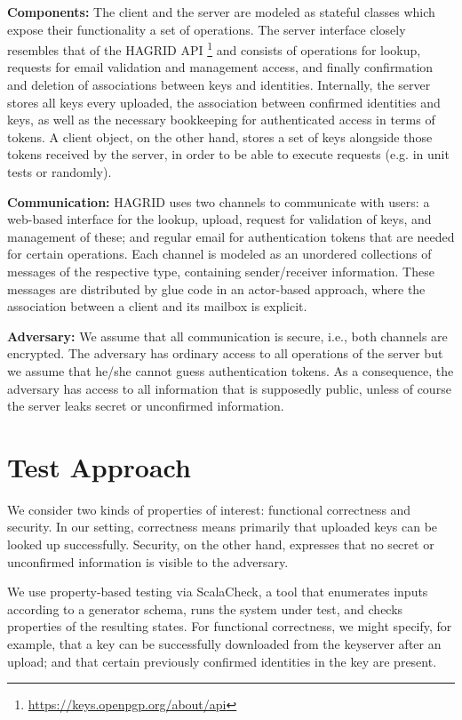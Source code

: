 \documentclass{llncs}
\begin{document}
\textbf{Components:} The client and the server are modeled as stateful classes which expose their functionality a set of operations.
The server interface closely resembles that of the HAGRID API%
    \footnote{\url{https://keys.openpgp.org/about/api}}
and consists of operations for lookup, requests for email validation and management access,
and finally confirmation and deletion of associations between keys and identities.
Internally, the server stores all keys every uploaded, the association between confirmed identities and keys,
as well as the necessary bookkeeping for authenticated access in terms of tokens.
A client object, on the other hand, stores a set of keys alongside those tokens received by the server, in order to be able to execute requests (e.g. in unit tests or randomly).

\textbf{Communication:} HAGRID uses two channels to communicate with users:
a web-based interface for the lookup, upload, request for validation of keys, and management of these;
and regular email for authentication tokens that are needed for certain operations.
Each channel is modeled as an unordered collections of messages of the respective type, containing sender/receiver information.
These messages are distributed by glue code in an actor-based approach,
where the association between a client and its mailbox is explicit.

\textbf{Adversary:} We assume that all communication is secure, i.e., both channels are encrypted.
The adversary has ordinary access to all operations of the server but we assume that he/she cannot guess authentication tokens.
As a consequence, the adversary has access to all information that is supposedly public,
unless of course the server leaks secret or unconfirmed information.

\section{Test Approach}

We consider two kinds of properties of interest: functional correctness and security.
In our setting, correctness means primarily that uploaded keys can be looked up successfully.
Security, on the other hand, expresses that no secret or unconfirmed information is visible to the adversary.

We use property-based testing via ScalaCheck, a tool that enumerates inputs according to a generator schema,
runs the system under test, and checks properties of the resulting states.
For functional correctness, we might specify, for example, that a key can be successfully downloaded from the keyserver after an upload;
and that certain previously confirmed identities in the key are present.
\end{document}
